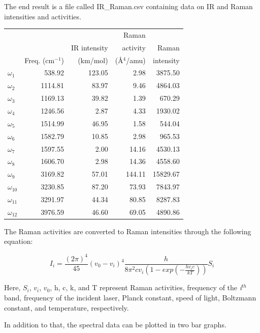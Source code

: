 \documentclass[12pt]{article}
\begin{document}
The end result is a file called IR\_Raman.csv containing data on IR and Raman intensities and activities.
\begin{table}[h]
\centering
\begin{tabular}{lrrrr}
\hline
 &  &               & Raman & \\ 
 &  & IR intensity & activity & Raman \\
 &    Freq. (cm$^{-1}$)               & (km/mol) & (\AA$^4$/amu) & intensity \\

\hline
$\omega_{1}$ & 538.92 & 123.05 & 2.98 & 3875.50 \\
$\omega_{2}$ & 1114.81 & 83.97 & 9.46 & 4864.03 \\
$\omega_{3}$ & 1169.13 & 39.82 & 1.39 & 670.29 \\
$\omega_{4}$ & 1246.56 & 2.87 & 4.33 & 1930.02 \\
$\omega_{5}$ & 1514.99 & 46.95 & 1.58 & 544.04 \\
$\omega_{6}$ & 1582.79 & 10.85 & 2.98 & 965.53 \\
$\omega_{7}$ & 1597.55 & 2.00 & 14.16 & 4530.13 \\
$\omega_{8}$ & 1606.70 & 2.98 & 14.36 & 4558.60 \\
$\omega_{9}$ & 3169.82 & 57.01 & 144.11 & 15829.67 \\
$\omega_{10}$ & 3230.85 & 87.20 & 73.93 & 7843.97 \\
$\omega_{11}$ & 3291.97 & 44.34 & 80.85 & 8287.83 \\
$\omega_{12}$ & 3976.59 & 46.60 & 69.05 & 4890.86 \\
\hline
\end{tabular}
\label{tab:data_table}
\end{table}

The Raman activities are converted to Raman intensities through the following equation:\cite{Polavarapu1990,Keresztury1993}

\begin{equation}
I_i = \frac{(2\pi)^4}{45}(v_0 - v_i)^4\frac{h}{8\pi^2cv_i(1-exp(-\frac{hv_ic}{kT}))}S_i
\end{equation}

Here, $S_i$, $v_i$, $v_0$, h, c, k, and T represent Raman activities, frequency of the \textit{i}$^{th}$ band, frequency of the incident laser, Planck constant, speed of light, Boltzmann constant, and temperature, respectively.

In addition to that, the spectral data can be plotted in two bar graphs.
\end{document}
